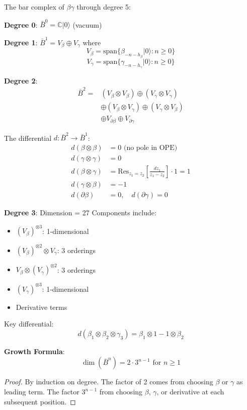 \begin{theorem}
The bar complex of $\beta\gamma$ through degree 5:

\textbf{Degree 0}: $\bar{B}^0 = \mathbb{C}|0\rangle$ (vacuum)

\textbf{Degree 1}: $\bar{B}^1 = V_\beta \oplus V_\gamma$ where
$$V_\beta = \text{span}\{\beta_{-n-h_\beta}|0\rangle : n \geq 0\}$$
$$V_\gamma = \text{span}\{\gamma_{-n-h_\gamma}|0\rangle : n \geq 0\}$$

\textbf{Degree 2}: 
\begin{align}
\bar{B}^2 = &(V_\beta \otimes V_\beta) \oplus (V_\gamma \otimes V_\gamma) \\
&\oplus (V_\beta \otimes V_\gamma) \oplus (V_\gamma \otimes V_\beta) \\
&\oplus V_{\partial\beta} \oplus V_{\partial\gamma}
\end{align}

The differential $d: \bar{B}^2 \to \bar{B}^1$:
\begin{align}
d(\beta \otimes \beta) &= 0 \text{ (no pole in OPE)} \\
d(\gamma \otimes \gamma) &= 0 \\
d(\beta \otimes \gamma) &= \text{Res}_{z_1=z_2}\left[\frac{dz_1}{z_1-z_2}\right] \cdot 1 = 1 \\
d(\gamma \otimes \beta) &= -1 \\
d(\partial\beta) &= 0, \quad d(\partial\gamma) = 0
\end{align}

\textbf{Degree 3}: Dimension = 27
Components include:
\begin{itemize}
\item $(V_\beta)^{\otimes 3}$: 1-dimensional
\item $(V_\beta)^{\otimes 2} \otimes V_\gamma$: 3 orderings
\item $V_\beta \otimes (V_\gamma)^{\otimes 2}$: 3 orderings
\item $(V_\gamma)^{\otimes 3}$: 1-dimensional
\item Derivative terms
\end{itemize}

Key differential:
$$d(\beta_1 \otimes \beta_2 \otimes \gamma_3) = \beta_1 \otimes 1 - 1 \otimes \beta_2$$

\textbf{Growth Formula}:
$$\dim(\bar{B}^n) = 2 \cdot 3^{n-1} \text{ for } n \geq 1$$
\end{theorem}

\begin{proof}
By induction on degree. The factor of 2 comes from choosing $\beta$ or $\gamma$ as leading term. The factor $3^{n-1}$ from choosing $\beta$, $\gamma$, or derivative at each subsequent position.
\end{proof}


